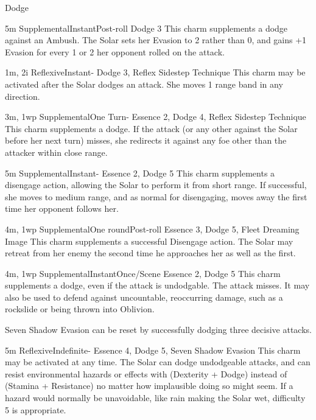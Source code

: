 \begin{Ability}{Dodge}

  {5m}
  {Supplemental}{Instant}{Post-roll}
  {Dodge 3}
  This charm supplements a dodge against an Ambush. The Solar sets her Evasion to 2 rather than 0, and gains +1 Evasion for every 1 or 2 her opponent rolled on the attack.

  {1m, 2i}
  {Reflexive}{Instant}{-}
  {Dodge 3, Reflex Sidestep Technique}
  This charm may be activated after the Solar dodges an attack. She moves 1 range band in any direction.

  {3m, 1wp}
  {Supplemental}{One Turn}{-}
  {Essence 2, Dodge 4, Reflex Sidestep Technique}
  This charm supplements a dodge. If the attack (or any other against the Solar before her next turn) misses, she redirects it against any foe other than the attacker within close range.

  {5m}
  {Supplemental}{Instant}{-}
  {Essence 2, Dodge 5}
  This charm supplements a disengage action, allowing the Solar to perform it from short range. If successful, she moves to medium range, and as normal for disengaging, moves away the first time her opponent follows her.

  {4m, 1wp}
  {Supplemental}{One round}{Post-roll}
  {Essence 3, Dodge 5, Fleet Dreaming Image}
  This charm supplements a successful Disengage action. The Solar may retreat from her enemy the second time he approaches her as well as the first.

  {4m, 1wp}
  {Supplemental}{Instant}{Once/Scene}
  {Essence 2, Dodge 5}
  This charm supplements a dodge, even if the attack is undodgable. The attack misses. It may also be used to defend against uncountable, reoccurring damage, such as a rockslide or being thrown into Oblivion.

  Seven Shadow Evasion can be reset by successfully dodging three decisive attacks.

  {5m}
  {Reflexive}{Indefinite}{-}
  {Essence 4, Dodge 5, Seven Shadow Evasion}
  This charm may be activated at any time. The Solar can dodge undodgeable attacks, and can resist environmental hazards or effects with (Dexterity + Dodge) instead of (Stamina + Resistance) no matter how implausible doing so might seem. If a hazard would normally be unavoidable, like rain making the Solar wet, difficulty 5 is appropriate.


\end{Ability}
